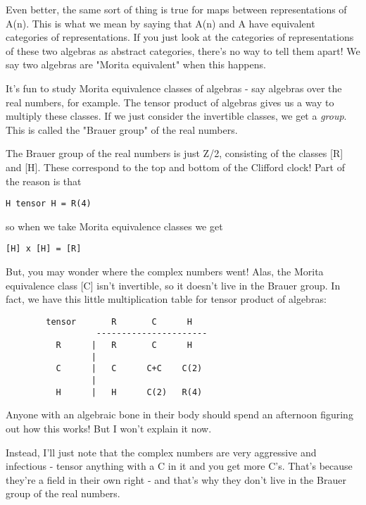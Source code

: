 Even better, the same sort of thing is true for maps between representations 
of A(n).  This is what we mean by saying that A(n) and A have equivalent
categories of representations.  If you just look at the categories of 
representations of these two algebras as abstract categories,
there's no way to tell them apart!
We say two algebras are "Morita equivalent" when this happens.

It's fun to study Morita equivalence classes of algebras - say algebras over 
the real numbers, for example.  The tensor product of algebras gives us a way 
to multiply these classes.  If we just consider the invertible classes, we get 
a \emph{group}.  
This is called the "Brauer group" of the real numbers.   

The Brauer group of the real numbers is just Z/2, consisting of the classes 
[R] and [H].  These correspond to the top and bottom of the Clifford clock!  
Part of the reason is that 

\begin{verbatim}
H tensor H = R(4)
\end{verbatim}
    
so when we take Morita equivalence classes we get

\begin{verbatim}
[H] x [H] = [R]
\end{verbatim}
    
But, you may wonder where the complex numbers went!  Alas, the Morita
equivalence class [C] isn't invertible, so it doesn't live in the Brauer 
group.  In fact, we have this little multiplication table for tensor product
of algebras:


\begin{verbatim}
        tensor       R       C      H
                  ----------------------
          R      |   R       C      H
                 |
          C      |   C      C+C    C(2)
                 |
          H      |   H      C(2)   R(4)

\end{verbatim}
    
Anyone with an algebraic bone in their body should spend an afternoon
figuring out how this works!  But I won't explain it now.

Instead, I'll just note that the complex numbers are very aggressive and
infectious - tensor anything with a C in it and you get more C's.  That's
because they're a field in their own right - and that's why they don't 
live in the Brauer group of the real numbers.  

